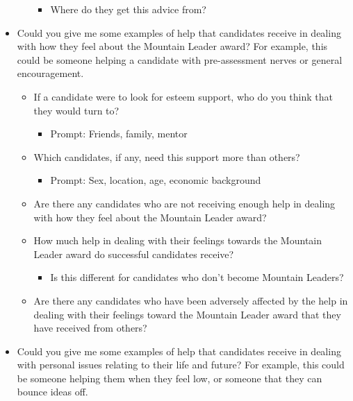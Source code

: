 \documentclass[
  12pt,
  a4paper,
]{book}
\providecommand{\tightlist}{%
  \setlength{\itemsep}{0pt}\setlength{\parskip}{0pt}}
\begin{document}
\begin{itemize}
\begin{itemize}
    \begin{itemize}
    \tightlist
    \item
      Where do they get this advice from?
    \end{itemize}
  \end{itemize}
\item
  Could you give me some examples of help that candidates receive in dealing with how they feel about the Mountain Leader award? For example, this could be someone helping a candidate with pre-assessment nerves or general encouragement.

  \begin{itemize}
  \tightlist
  \item
    If a candidate were to look for esteem support, who do you think that they would turn to?

    \begin{itemize}
    \tightlist
    \item
      Prompt: Friends, family, mentor
    \end{itemize}
  \item
    Which candidates, if any, need this support more than others?

    \begin{itemize}
    \tightlist
    \item
      Prompt: Sex, location, age, economic background
    \end{itemize}
  \item
    Are there any candidates who are not receiving enough help in dealing with how they feel about the Mountain Leader award?
  \item
    How much help in dealing with their feelings towards the Mountain Leader award do successful candidates receive?

    \begin{itemize}
    \tightlist
    \item
      Is this different for candidates who don't become Mountain Leaders?
    \end{itemize}
  \item
    Are there any candidates who have been adversely affected by the help in dealing with their feelings toward the Mountain Leader award that they have received from others?
  \end{itemize}
\item
  Could you give me some examples of help that candidates receive in dealing with personal issues relating to their life and future? For example, this could be someone helping them when they feel low, or someone that they can bounce ideas off.


\end{itemize}
\end{document}
